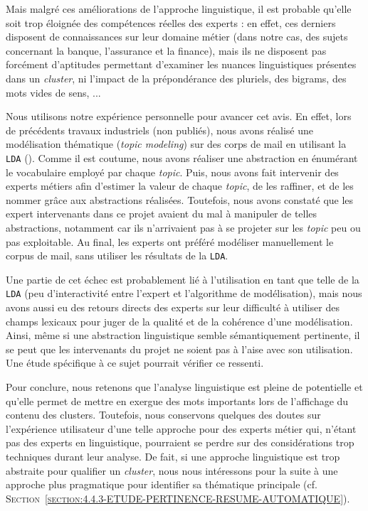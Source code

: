 			Mais malgré ces améliorations de l'approche linguistique, il est probable qu'elle soit trop éloignée des compétences réelles des experts : en effet, ces derniers disposent de connaissances sur leur domaine métier (dans notre cas, des sujets concernant la banque, l'assurance et la finance), mais ils ne disposent pas forcément d'aptitudes permettant d'examiner les nuances linguistiques présentes dans un \textit{cluster}, ni l'impact de la prépondérance des pluriels, des bigrams, des mots vides de sens, ...
		
			\begin{leftBarAuthorOpinion}
				Nous utilisons notre expérience personnelle pour avancer cet avis.
				En effet, lors de précédents travaux industriels (non publiés), nous avons réalisé une modélisation thématique (\textit{topic modeling}) sur des corps de mail en utilisant la \texttt{LDA} (\cite{blei-etal:2003:latent-dirichlet-allocation}).
				Comme il est coutume, nous avons réaliser une abstraction en énumérant le vocabulaire employé par chaque \textit{topic}.
				Puis, nous avons fait intervenir des experts métiers afin d'estimer la valeur de chaque \textit{topic}, de les raffiner, et de les nommer grâce aux abstractions réalisées.
				Toutefois, nous avons constaté que les expert intervenants dans ce projet avaient du mal à manipuler de telles abstractions, notamment car ils n'arrivaient pas à se projeter sur les \textit{topic} peu ou pas exploitable.
				Au final, les experts ont préféré modéliser manuellement le corpus de mail, sans utiliser les résultats de la \texttt{LDA}.
				
				Une partie de cet échec est probablement lié à l'utilisation en tant que telle de la \texttt{LDA} (peu d'interactivité entre l'expert et l'algorithme de modélisation), mais nous avons aussi eu des retours directs des experts sur leur difficulté à utiliser des champs lexicaux pour juger de la qualité et de la cohérence d'une modélisation.
				Ainsi, même si une abstraction linguistique semble sémantiquement pertinente, il se peut que les intervenants du projet ne soient pas à l'aise avec son utilisation.
				Une étude spécifique à ce sujet pourrait vérifier ce ressenti.
			\end{leftBarAuthorOpinion}
			
			Pour conclure, nous retenons que l'analyse linguistique est pleine de potentielle et qu'elle permet de mettre en exergue des mots importants lors de l'affichage du contenu des clusters.
			Toutefois, nous conservons quelques des doutes sur l'expérience utilisateur d'une telle approche pour des experts métier qui, n'étant pas des experts en linguistique, pourraient se perdre sur des considérations trop techniques durant leur analyse.
			De fait, si une approche linguistique est trop abstraite pour qualifier un \textit{cluster}, nous nous intéressons pour la suite à une approche plus pragmatique pour identifier sa thématique principale (cf. \textsc{Section~\ref{section:4.4.3-ETUDE-PERTINENCE-RESUME-AUTOMATIQUE}}).
	
